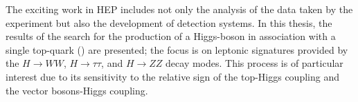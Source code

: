 \footnotesize
The exciting work in HEP includes not only the analysis of the data taken by the experiment but also the development of detection systems. In this thesis, the results of the search for the production of a Higgs-boson in association with a single top-quark (\tH) are presented; the focus is on leptonic signatures provided by the $H \to WW$, $H \to \tau\tau$, and $H \to ZZ$ decay modes. This process is of particular interest due to its sensitivity to the relative sign of the top-Higgs coupling and the vector bosons-Higgs coupling.





